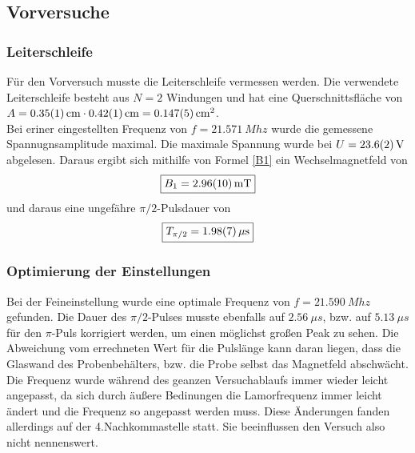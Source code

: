 \documentclass[12pt,a4paper]{article}
\begin{document}
\subsection{Vorversuche}

\subsubsection{Leiterschleife}

Für den Vorversuch musste die Leiterschleife vermessen werden. Die verwendete Leiterschleife besteht aus $N=2$ Windungen und hat eine Querschnittsfläche von $A =  \SI{0.35\pm 0.01}{cm} \cdot \SI{0.42\pm 0.01}{cm} = \SI{0.147\pm 0.005}{cm^2}$.\\
Bei eriner eingestellten Frequenz von $f = \SI{21.571}{Mhz}$ wurde die gemessene Spannugnsamplitude maximal. Die maximale Spannung wurde bei $U =\SI{23.6\pm 0.2}{V}$ abgelesen. Daraus ergibt sich mithilfe von Formel \ref{B1} ein Wechselmagnetfeld von 
\begin{equation*}
\boxed{B_1 = \SI{2.96\pm 0.10}{mT}}
\end{equation*}
und daraus eine ungefähre $\pi /2$-Pulsdauer von
\begin{equation*}
\boxed{T_{\pi /2} = \SI{1.98\pm 0.07}{\mu s}}
\end{equation*}
\subsubsection{Optimierung der Einstellungen}
Bei der Feineinstellung wurde eine optimale Frequenz von  $f = \SI{21.590}{Mhz}$ gefunden. Die Dauer des $\pi / 2 $-Pulses musste ebenfalls auf $\SI{2.56}{\mu s}$, bzw. auf $\SI{5.13}{\mu s}$ für den $\pi$-Puls korrigiert werden, um einen möglichst großen Peak zu sehen. Die Abweichung vom errechneten Wert für die Pulslänge kann daran liegen, dass die Glaswand des Probenbehälters, bzw. die Probe selbst das Magnetfeld abschwächt.\\
Die Frequenz wurde während des geanzen Versuchablaufs immer wieder leicht angepasst, da sich durch äußere Bedinungen die Lamorfrequenz immer leicht ändert und die Frequenz so angepasst werden muss. Diese Änderungen fanden allerdings auf der 4.Nachkommastelle statt. Sie beeinflussen den Versuch also nicht nennenswert.
\end{document}
